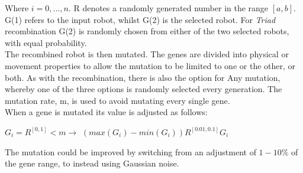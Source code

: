 \documentclass{article}
\begin{document}
Where $i = 0, ..., n$. R denotes a randomly generated number in the range $[a, b]$. G(1) refers to the input robot, whilst G(2) is the selected robot. For \textit{Triad} recombination G(2) is randomly chosen from either of the two selected robots, with equal probability.
\\[1\baselineskip]
The recombined robot is then mutated. The genes are divided into physical or movement properties to allow the mutation to be limited to one or the other, or both. As with the recombination, there is also the option for Any mutation, whereby one of the three options is randomly selected every generation. 
The mutation rate, m, is used to avoid mutating every single gene.\\
When a gene is mutated its value is adjusted as follows:
\begin{center}
\begin{Large}
$G_{i} = R^{[0, 1]} < m \longrightarrow $
$(max(G_{i}) - min(G_{i})) R^{[0.01, 0.1]}  G_{i}$\\[1\baselineskip]
\end{Large}
\end{center}
The mutation could be improved by switching from an adjustment of $1-10\%$ of the gene range, to instead using Gaussian noise. \\
\end{document}
